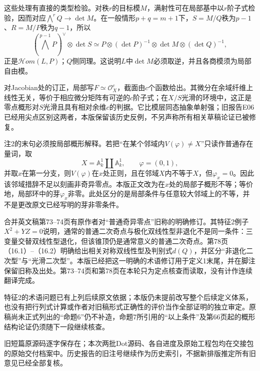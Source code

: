 这些处理有直接的类型检验。对秩$r$的目标模$M$，满射性可在局部基中以$r$阶子式检验，因而对应$\bigwedge^rQ\to\det M$。在一般情形$p+q=m+1$下，$S=M/Q$秩为$p-1$、$R=M/P$秩为$q-1$，所以
\[
 (\bigwedge^{p-1}P)^\vee\otimes\det S
 \simeq P\otimes(\det P)^{-1}\otimes\det M\otimes(\det Q)^{-1},
\]
正是$\mathscr{H}\!om(L,P)$；$Q$侧同理。这说明$L$中$\det M$必须取逆，并且各商模须为局部自由模。

对Jacobian处的订正，局部写$F\simeq\mathcal O_X^c$，截面由$c$个函数给出。其微分在余域纤维上线性无关，等价于相应微分矩阵有可逆的$c$阶子式；在$X/S$光滑的环境中，这正是零点概形对$S$光滑且具有相对余维$c$的判据。它比模层同态抽象单射强；旧报告E06已经用尖点区别这两者，本版保留该历史反例，不另声称所有相关草稿论证已被修复。

注2的末句必须按局部概形解释。若把“在某个邻域内$V(\varphi)\ne X$”只读作普通存在量词，取
\[
 X=\mathbb A^1_k\amalg\mathbb A^1_k,\qquad \varphi=(0,1),
\]
并取$x$在第一分支，则$V(\varphi)$在$x$处正则，且在邻域$X$内不等于$X$，但$\varphi_x=0$。因此该邻域措辞不足以刻画非奇异零点。本版正文改为在$x$处的局部子概形不等；等价地，局部环中的芽$\varphi_x$非零。此处区分的是局部条件与任意较大邻域上的不等，并不是更改原文已经写明的芽非零条件。

合并英文稿第73--74页有原作者对“普通奇异零点”旧称的明确修订。其特征2例子$X^2+YZ=0$说明，通常的普通二次奇点与极化双线性型非退化不是同一条件：三变量交替双线性型退化，但该锥顶仍是通常意义的普通二次奇点。第78页（16.1）--（16.2）明确给出相关对称双线性型及判别式$d(Q)$，并区分“非退化二次型”与“光滑二次型”。本版已经把这一明确的术语修订用于定义1末尾，并在脚注保留旧称及出处。第73--74页和第78页在本轮只为定点核查而读取，没有计作连续翻译完成。

特征2的术语问题已有上列后续原文依据；本版仍未提前改写整个后续定义体系，也没有把行列式计算或作者对旧稿形式正确性的评价当作全部证明的独立审定。原稿尚未正式列出的“命题6”仍不补造，命题7所引用的“以上条件”及第66页起的概形结构论证仍须随下一段继续核查。

旧短篇原源码逐字保存在；本次两批Dot源码、各自进度及原始工程包均在交接包的原始交付档案中。历史报告的旧注号继续作为历史索引，不据新排版推定所有旧意见已经全部复核。
